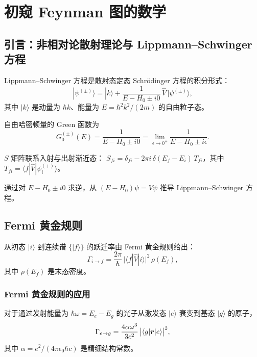 \chapter{初窥 Feynman 图的数学}

\section{引言：非相对论散射理论与 Lippmann--Schwinger 方程}

Lippmann--Schwinger 方程是散射态定态 Schr\"odinger 方程的积分形式：
\begin{equation}
|\psi^{(\pm)}\rangle = |k\rangle
+ \frac{1}{E-H_0\pm i0}\,\hat V\,|\psi^{(\pm)}\rangle,
\label{eq:10.1.1}
\end{equation}
其中 $|k\rangle$ 是动量为 $\hbar k$、能量为 $E=\hbar^2k^2/(2m)$ 的自由粒子态。

自由哈密顿量的 Green 函数为
\begin{equation}
G_0^{(\pm)}(E) = \frac{1}{E-H_0\pm i0}
= \lim_{\epsilon\to0^+}\frac{1}{E-H_0\pm i\epsilon}.
\label{eq:10.1.2}
\end{equation}

$S$ 矩阵联系入射与出射渐近态：
$S_{fi}=\delta_{fi}-2\pi i\,\delta(E_f-E_i)\,T_{fi}$，其中
$T_{fi}=\langle f|\hat V|\psi_i^{(+)}\rangle$。

\begin{exercise}
通过对 $E-H_0\pm i0$ 求逆，从 $(E-H_0)\psi=V\psi$ 推导 Lippmann--Schwinger 方程。
\end{exercise}

\section{Fermi 黄金规则}

从初态 $|i\rangle$ 到连续谱 $\{|f\rangle\}$ 的跃迁率由 Fermi 黄金规则给出：
\begin{equation}
\Gamma_{i\to f} = \frac{2\pi}{\hbar}\,
\bigl|\langle f|\hat V|i\rangle\bigr|^2\,\rho(E_f),
\label{eq:10.2.1}
\end{equation}
其中 $\rho(E_f)$ 是末态密度。

\subsection{Fermi 黄金规则的应用}

对于通过发射能量为 $\hbar\omega=E_e-E_g$ 的光子从激发态 $|e\rangle$ 衰变到基态 $|g\rangle$ 的原子，
\begin{equation}
\Gamma_{e\to g} = \frac{4\alpha\omega^3}{3c^2}\,
\bigl|\langle g|\bm{r}|e\rangle\bigr|^2,
\label{eq:10.2.2}
\end{equation}
其中 $\alpha=e^2/(4\pi\epsilon_0\hbar c)$ 是精细结构常数。

